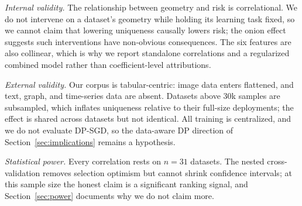 \emph{Internal validity.} The relationship between geometry and risk is
correlational. We do not intervene on a dataset's geometry while
holding its learning task fixed, so we cannot claim that lowering
uniqueness causally lowers risk; the onion
effect~\cite{carlini2022onion} suggests such interventions have
non-obvious consequences. The six features are also collinear, which is
why we report standalone correlations and a regularized combined model
rather than coefficient-level attributions.

\emph{External validity.} Our corpus is tabular-centric: image data
enters flattened, and text, graph, and time-series data are absent.
Datasets above 30k samples are subsampled, which inflates uniqueness
relative to their full-size deployments; the effect is shared across
datasets but not identical. All training is centralized, and we do not
evaluate DP-SGD, so the data-aware DP direction of
Section~\ref{sec:implications} remains a hypothesis.

\emph{Statistical power.} Every correlation rests on $n = 31$ datasets.
The nested cross-validation removes selection optimism but cannot
shrink confidence intervals; at this sample size the honest claim is a
significant ranking signal, and Section~\ref{sec:power} documents why
we do not claim more.
